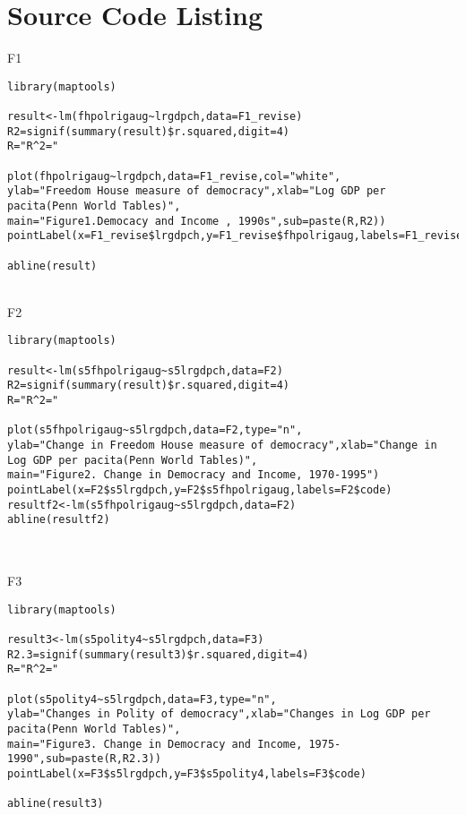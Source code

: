 \section{Source Code Listing}




F1
\begin{lstlisting}
library(maptools)

result<-lm(fhpolrigaug~lrgdpch,data=F1_revise)
R2=signif(summary(result)$r.squared,digit=4)
R="R^2="

plot(fhpolrigaug~lrgdpch,data=F1_revise,col="white",
ylab="Freedom House measure of democracy",xlab="Log GDP per pacita(Penn World Tables)",
main="Figure1.Democacy and Income , 1990s",sub=paste(R,R2))
pointLabel(x=F1_revise$lrgdpch,y=F1_revise$fhpolrigaug,labels=F1_revise$code,col="black")

abline(result)

\end{lstlisting}

\\
F2
\begin{lstlisting}
library(maptools)

result<-lm(s5fhpolrigaug~s5lrgdpch,data=F2)
R2=signif(summary(result)$r.squared,digit=4)
R="R^2="

plot(s5fhpolrigaug~s5lrgdpch,data=F2,type="n",
ylab="Change in Freedom House measure of democracy",xlab="Change in Log GDP per pacita(Penn World Tables)",
main="Figure2. Change in Democracy and Income, 1970-1995")
pointLabel(x=F2$s5lrgdpch,y=F2$s5fhpolrigaug,labels=F2$code)
resultf2<-lm(s5fhpolrigaug~s5lrgdpch,data=F2)
abline(resultf2)


\end{lstlisting}

\\
F3
\begin{lstlisting}
library(maptools)

result3<-lm(s5polity4~s5lrgdpch,data=F3)
R2.3=signif(summary(result3)$r.squared,digit=4)
R="R^2="

plot(s5polity4~s5lrgdpch,data=F3,type="n",
ylab="Changes in Polity of democracy",xlab="Changes in Log GDP per pacita(Penn World Tables)",
main="Figure3. Change in Democracy and Income, 1975-1990",sub=paste(R,R2.3))
pointLabel(x=F3$s5lrgdpch,y=F3$s5polity4,labels=F3$code)

abline(result3)


\end{lstlisting}

